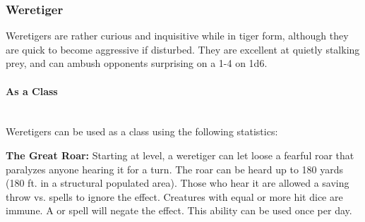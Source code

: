 \begin{multicols*}{2}
\subsubsection{Weretiger}

Weretigers are rather curious and inquisitive while in tiger form, although they are quick to become aggressive if disturbed. They are excellent at quietly stalking prey, and can ambush opponents surprising on a 1-4 on 1d6.

\paragraph{As a Class}\mbox{}\\
Weretigers can be used as a class using the following statistics:

\textbf{The Great Roar:} Starting at  level, a weretiger can let loose a fearful roar that paralyzes anyone hearing it for a turn. The roar can be heard up to 180 yards (180 ft. in a structural populated area). Those who hear it are allowed a saving throw vs. spells to ignore the effect. Creatures with equal or more hit dice are immune. A  or  spell will negate the effect. This ability can be used once per day.

\end{multicols*}
